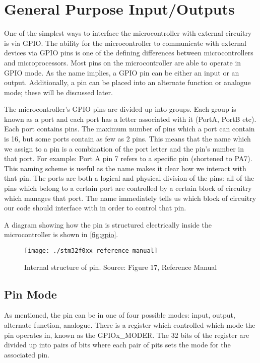 \chapter{General Purpose Input/Outputs}

One of the simplest ways to interface the microcontroller with external circuitry is via GPIO. The ability for the microcontroller to communicate with external devices via GPIO pins is one of the defining differences between microcontrollers and microprocessors.
Most pins on the microcontroller are able to operate in GPIO mode. As the name implies, a GPIO pin can be either an input or an output. Additionally, a pin can be placed into an alternate function or analogue mode; these will be discussed later.

The microcontroller's GPIO pins are divided up into groups. Each group is known as a port and each port has a letter associated with it (PortA, PortB etc). Each port contains pins. The maximum number of pins which a port can contain is 16, but some ports contain as few as 2 pins. This means that the name which we assign to a pin is a combination of the port letter and the pin's number in that port. For example: Port A pin 7 refers to a specific pin (shortened to PA7). This naming scheme is useful as the name makes it clear how we interact with that pin. The ports are both a logical and physical division of the pins: all of the pins which belong to a certain port are controlled by a certain block of circuitry which manages that port. The name immediately tells us which block of circuitry our code should interface with in order to control that pin.

A diagram showing how the pin is structured electrically inside the microcontroller is shown in \autoref{fig:gpio}. 
\begin{figure}
\centering
\texttt{[image: ./stm32f0xx\_reference\_manual]}
\caption{Internal structure of pin. Source: Figure 17, Reference Manual}
\label{fig:gpio}
\end{figure}


\section{Pin Mode}
As mentioned, the pin can be in one of four possible modes: input, output, alternate function, analogue. There is a register which controlled which mode the pin operates in, known as the GPIOx\_MODER. The 32 bits of the register are divided up into pairs of bits where each pair of pits sets the mode for the associated pin. 

